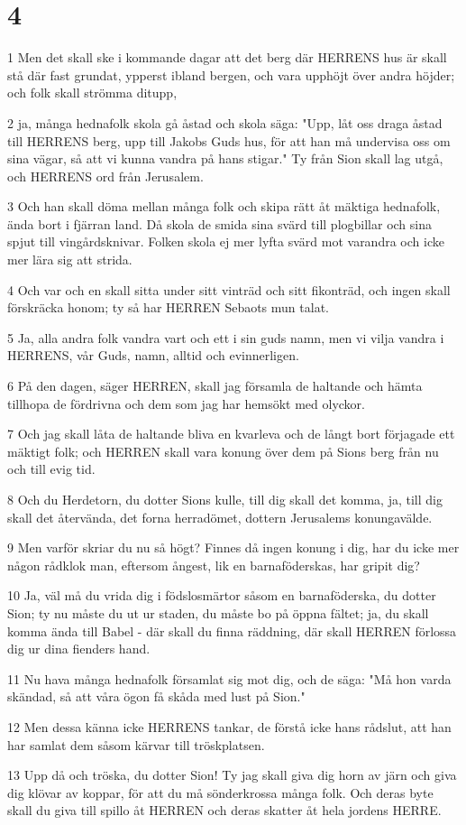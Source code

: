 \chapter{4}

\par 1 Men det skall ske i kommande dagar att det berg där HERRENS hus är skall stå där fast grundat, ypperst ibland bergen, och vara upphöjt över andra höjder; och folk skall strömma ditupp,
\par 2 ja, många hednafolk skola gå åstad och skola säga: "Upp, låt oss draga åstad till HERRENS berg, upp till Jakobs Guds hus, för att han må undervisa oss om sina vägar, så att vi kunna vandra på hans stigar." Ty från Sion skall lag utgå, och HERRENS ord från Jerusalem.
\par 3 Och han skall döma mellan många folk och skipa rätt åt mäktiga hednafolk, ända bort i fjärran land. Då skola de smida sina svärd till plogbillar och sina spjut till vingårdsknivar. Folken skola ej mer lyfta svärd mot varandra och icke mer lära sig att strida.
\par 4 Och var och en skall sitta under sitt vinträd och sitt fikonträd, och ingen skall förskräcka honom; ty så har HERREN Sebaots mun talat.
\par 5 Ja, alla andra folk vandra vart och ett i sin guds namn, men vi vilja vandra i HERRENS, vår Guds, namn, alltid och evinnerligen.
\par 6 På den dagen, säger HERREN, skall jag församla de haltande och hämta tillhopa de fördrivna och dem som jag har hemsökt med olyckor.
\par 7 Och jag skall låta de haltande bliva en kvarleva och de långt bort förjagade ett mäktigt folk; och HERREN skall vara konung över dem på Sions berg från nu och till evig tid.
\par 8 Och du Herdetorn, du dotter Sions kulle, till dig skall det komma, ja, till dig skall det återvända, det forna herradömet, dottern Jerusalems konungavälde.
\par 9 Men varför skriar du nu så högt? Finnes då ingen konung i dig, har du icke mer någon rådklok man, eftersom ångest, lik en barnaföderskas, har gripit dig?
\par 10 Ja, väl må du vrida dig i födslosmärtor såsom en barnaföderska, du dotter Sion; ty nu måste du ut ur staden, du måste bo på öppna fältet; ja, du skall komma ända till Babel - där skall du finna räddning, där skall HERREN förlossa dig ur dina fienders hand.
\par 11 Nu hava många hednafolk församlat sig mot dig, och de säga: "Må hon varda skändad, så att våra ögon få skåda med lust på Sion."
\par 12 Men dessa känna icke HERRENS tankar, de förstå icke hans rådslut, att han har samlat dem såsom kärvar till tröskplatsen.
\par 13 Upp då och tröska, du dotter Sion! Ty jag skall giva dig horn av järn och giva dig klövar av koppar, för att du må sönderkrossa många folk. Och deras byte skall du giva till spillo åt HERREN och deras skatter åt hela jordens HERRE.


